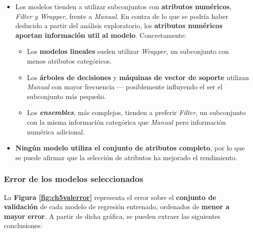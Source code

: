 \begin{itemize}[leftmargin=*, parsep=1pt, itemsep=2pt, topsep=1pt]
	\item Los modelos tienden a utilizar subconjuntos con \textbf{atributos numéricos}, \textit{Filter y Wrapper}, frente a \textit{Manual}. En contra de lo que se podría haber deducido a partir del análisis exploratorio, los \textbf{atributos numéricos aportan información util al modelo}. Concretamente:
	\begin{itemize}[parsep=1pt, itemsep=2pt, topsep=1pt]
		\item Los \textbf{modelos lineales} suelen utilizar \textit{Wrapper}, un subconjunto con menos atributos categóricos.
		\item Los \textbf{árboles de decisiones} y \textbf{máquinas de vector de soporte} utilizan \textit{Manual} con mayor frecuencia --- posiblemente influyendo el ser el subconjunto más pequeño.
		\item Los \textit{\textbf{ensembles}}, más complejos, tienden a preferir \textit{Filter}, un subconjunto con la misma información categórica que \textit{Manual} pero información numérica adicional.
	\end{itemize}
	\item \textbf{Ningún modelo utiliza el conjunto de atributos completo}, por lo que se puede afirmar que la selección de atributos ha mejorado el rendimiento.
\end{itemize}

\subsubsection{Error de los modelos seleccionados}

La \textbf{Figura \ref{fig:ch5valerror}} representa el error sobre el \textbf{conjunto de validación} de cada modelo de regresión entrenado, ordenados de \textbf{menor a mayor error}. A partir de dicha gráfica, se pueden extraer las siguientes conclusiones:

